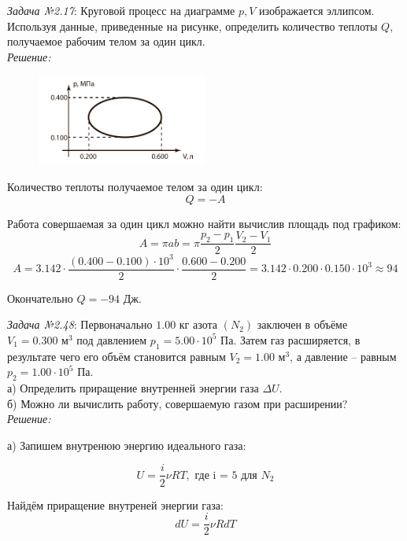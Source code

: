 \documentclass[14pt,final,titlepage,pscyr]{hedsemwork}
\begin{document}
\maketitle
\emph{Задача №2.17}: Круговой процесс на диаграмме \( p, V \) изображается 
эллипсом. Используя данные, приведенные на рисунке, определить количество 
теплоты \( Q \), получаемое рабочим телом за один цикл. \\

\emph{Решение:}

\begin{figure}
    \vspace{-2ex}
    \includegraphics[width=0.5\textwidth]{img01}
\end{figure}

Количество теплоты получаемое телом за один цикл:
\[
	Q = -A
\]

Работа совершаемая за один цикл можно найти вычислив площадь под графиком:
\[
	A = \pi ab = \pi\frac{p_2 - p_1}{2}\frac{V_2 - V_1}{2}
\]
\[
	A = 3.142\cdot\frac{(0.400-0.100)\cdot10^3}{2}\cdot\frac{0.600-0.200}{2} =
		3.142\cdot0.200\cdot0.150\cdot10^3 \approx 94
\]

Окончательно \( Q = -94 \) Дж.

\newpage
\emph{Задача №2.48}: Первоначально \( 1.00 \) кг азота \((N_2)\) заключен 
в объёме \( V_1 = 0.300 \text{ м}^3 \) под давлением 
\( p_1 = 5.00\cdot10^5 \) Па. Затем газ расширяется, в результате чего 
его объём становится равным \( V_2 = 1.00 \text{ м}^3 \), а давление -- 
равным \( p_2 = 1.00\cdot10^5 \) Па. \\
а) Определить приращение внутренней энергии газа \( \Delta U \). \\
б) Можно ли вычислить работу, совершаемую газом при расширении? \\

\emph{Решение:}

а) Запишем внутренюю энергию идеального газа:

\[
	U = \frac{i}{2}\nu RT, \text{ где i = 5 для } N_2
\]

Найдём приращение внутреней энергии газа:
\begin{equation}
	dU = \frac{i}{2}\nu RdT
	\label{eq:dot}
\end{equation}
\end{document}
